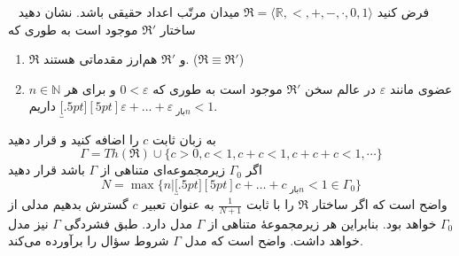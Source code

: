 ~
فرض کنید $\mathfrak{R} = \langle \mathbb{R}, <, +, -, \cdot, 0, 1 \rangle$ میدان مرتّب اعداد حقیقی باشد. نشان دهید ساختار $\mathfrak{R}'$ موجود است به طوری که
\begin{enumerate}[label=(\alph*)]
  \item $\mathfrak{R}$ و $\mathfrak{R}'$ هم‌ارز مقدماتی هستند. ($\mathfrak{R} \equiv \mathfrak{R}'$)
  \item عضوی مانند $\varepsilon$ در عالم سخن $\mathfrak{R}'$ موجود است به طوری که $0 < \varepsilon$ و برای هر $n \in \mathbb{N}$ داریم $\underbracket[.5pt][5pt]{\varepsilon + \dots + \varepsilon}_{\text{ بار} n} < 1$.
\end{enumerate}\quad
\begin{ans}
  به زبان ثابت $c$ را اضافه کنید و قرار دهید
  $$
  \Gamma=Th(\mathfrak{R}) \cup \{c>0, c<1, c+c<1, c+c+c<1,\cdots\}
  $$
  اگر $\Gamma_0$ زیرمجموعه‌ای متناهی از $\Gamma$ باشد قرار دهید
  $$N=\max\{n|\underbracket[.5pt][5pt]{c + \dots + c}_{\text{ بار} n} < 1\in \Gamma_0\}$$
  واضح است که اگر ساختار
  $\mathfrak{R}$
  را با ثابت
  $\frac{1}{N+1}$ به عنوان تعبیر $c$ گسترش بدهیم مدلی از $\Gamma_0$ خواهد بود. بنابراین هر زیرمجموعهٔ متناهی از $\Gamma$ مدل دارد. طبق فشردگی $\Gamma$ نیز مدل خواهد داشت. واضح است که مدل $\Gamma$ شروط سؤال را برآورده می‌کند.
\end{ans}